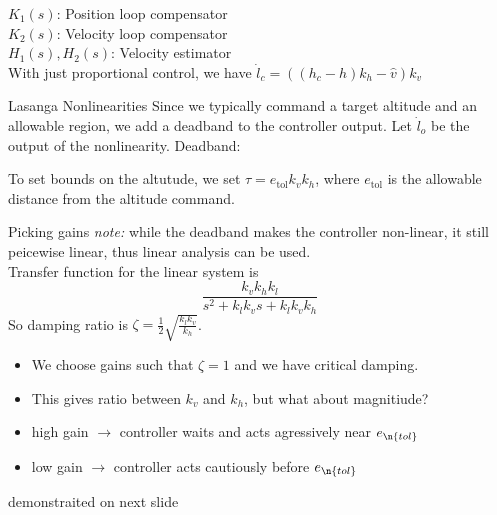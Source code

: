 \documentclass[10pt,mathserif]{beamer}
\begin{document}
\begin{frame}
\begin{center}
\begin{tikzpicture}
\end{tikzpicture}
\end{center}
$K_1(s)$: Position loop compensator \\
$K_2(s)$: Velocity loop compensator \\
$H_1(s), H_2(s)$: Velocity estimator \\
With just proportional control, we have $\dot l_c = ((h_c - h) k_h - \hat v) k_v$
\end{frame}

\begin{frame}{Lasanga Nonlinearities}
Since we typically command a target altitude and an allowable region, we add a deadband to the controller output. Let $\dot l_o$ be the output of the nonlinearity.
Deadband:
\begin{center}
\end{center}
To set bounds on the altutude, we set $\tau = e_{\mathrm{tol}} k_v k_h$, where $e_{\mathrm{tol}}$ is the allowable distance from the altitude command.
\end{frame}

\begin{frame}{Picking gains}
\emph{note:} while the deadband makes the controller non-linear, it still peicewise linear, thus linear analysis can be used.\\
Transfer function for the linear system is\\
\[\frac{k_v k_h k_l}{s^2 + k_l k_v s + k_l k_v k_h}\]
So damping ratio is $\zeta = \frac{1}{2}\sqrt{\frac{k_l k_v}{k_h}}$. 
\begin{itemize}
\item We choose gains such that $\zeta = 1$ and we have critical damping.
\item This gives ratio between $k_v$ and $k_h$, but what about magnitiude?
\item high gain $\to$ controller waits and acts agressively near $e_{\n{tol}}$
\item low gain $\to$ controller acts cautiously before $e_{\n{tol}}$
\end{itemize}
demonstraited on next slide
\end{frame}
\end{document}
